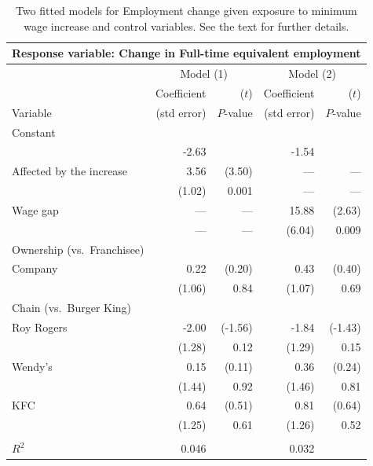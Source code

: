 \begin{table}[t]
\caption{Two fitted models for Employment change
given exposure to minimum wage increase and control variables. See the
text for further details.}
\label{t_fastfood_models}
\begin{center}
\begin{tabular}{|l|rr|rr|}\hline
\multicolumn{5}{|l|}{Response
variable: Change in Full-time equivalent employment}\\ \hline
& \multicolumn{2}{|c|}{Model (1)} &
 \multicolumn{2}{|c|}{Model (2)} \\
& Coefficient & ($t$) & Coefficient & ($t$) \\
Variable & (std error)& $P$-value & (std error)& $P$-value \\  \hline
Constant & & & & \\
& -2.63 & & -1.54 & \\[.7ex]
Affected by the increase & 3.56 & (3.50)& --- & --- \\
 & (1.02) & 0.001 & --- & --- \\[.7ex]
Wage gap & --- & --- & 15.88 & (2.63)\\
& --- & --- & (6.04) & 0.009 \\[.7ex]
Ownership (vs.\ Franchisee)& & & & \\
\hspace*{1em}Company & 0.22 & (0.20)& 0.43 & (0.40) \\
& (1.06) & 0.84& (1.07) & 0.69 \\[.7ex]
Chain (vs.\ Burger King) & & & & \\
\hspace*{1em}Roy Rogers & -2.00 & (-1.56)& -1.84 & (-1.43)\\
& (1.28) & 0.12 & (1.29)& 0.15\\
\hspace*{1em}Wendy's & 0.15 & (0.11)& 0.36 & (0.24)\\
& (1.44) & 0.92& (1.46)& 0.81\\
\hspace*{1em}KFC & 0.64 & (0.51)& 0.81 & (0.64)\\
& (1.25)& 0.61 & (1.26)& 0.52 \\ \hline
\vspace*{-2ex} & & & & \\
\hspace*{10em}$R^{2}$ & 0.046& & 0.032 & \\
\hline
\end{tabular}
\end{center}
\vspace*{-3ex}
\end{table}

